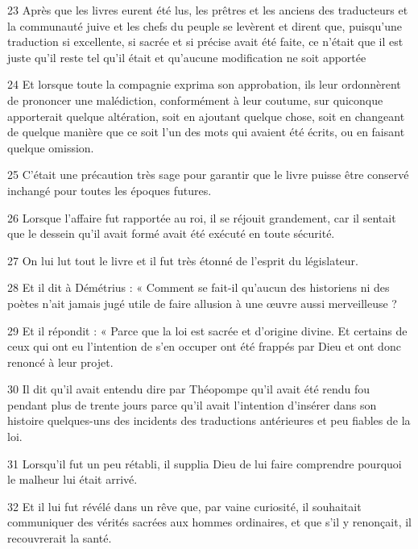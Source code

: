 \par 23 Après que les livres eurent été lus, les prêtres et les anciens des traducteurs et la communauté juive et les chefs du peuple se levèrent et dirent que, puisqu'une traduction si excellente, si sacrée et si précise avait été faite, ce n'était que il est juste qu'il reste tel qu'il était et qu'aucune modification ne soit apportée

\par 24 Et lorsque toute la compagnie exprima son approbation, ils leur ordonnèrent de prononcer une malédiction, conformément à leur coutume, sur quiconque apporterait quelque altération, soit en ajoutant quelque chose, soit en changeant de quelque manière que ce soit l'un des mots qui avaient été écrits, ou en faisant quelque omission.

\par 25 C'était une précaution très sage pour garantir que le livre puisse être conservé inchangé pour toutes les époques futures.

\par 26 Lorsque l'affaire fut rapportée au roi, il se réjouit grandement, car il sentait que le dessein qu'il avait formé avait été exécuté en toute sécurité.

\par 27 On lui lut tout le livre et il fut très étonné de l'esprit du législateur.

\par 28 Et il dit à Démétrius : « Comment se fait-il qu'aucun des historiens ni des poètes n'ait jamais jugé utile de faire allusion à une œuvre aussi merveilleuse ?

\par 29 Et il répondit : « Parce que la loi est sacrée et d'origine divine. Et certains de ceux qui ont eu l'intention de s'en occuper ont été frappés par Dieu et ont donc renoncé à leur projet.

\par 30 Il dit qu'il avait entendu dire par Théopompe qu'il avait été rendu fou pendant plus de trente jours parce qu'il avait l'intention d'insérer dans son histoire quelques-uns des incidents des traductions antérieures et peu fiables de la loi.

\par 31 Lorsqu'il fut un peu rétabli, il supplia Dieu de lui faire comprendre pourquoi le malheur lui était arrivé.

\par 32 Et il lui fut révélé dans un rêve que, par vaine curiosité, il souhaitait communiquer des vérités sacrées aux hommes ordinaires, et que s'il y renonçait, il recouvrerait la santé.

